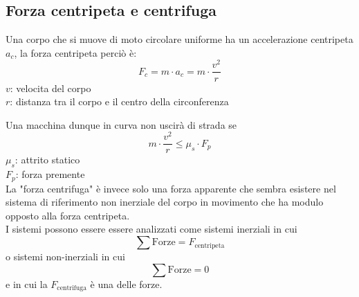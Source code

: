 \subsection{Forza centripeta e centrifuga}
Una corpo che si muove di moto circolare uniforme ha un accelerazione centripeta $a_c$, la forza 
centripeta perciò è:   
\begin{equation*}
  F_c =m\cdot a_c= m\cdot\frac{v^{2}}{r}
\end{equation*}
$v$: velocita del corpo\\
$r$: distanza tra il corpo e il centro della circonferenza
\begin{center}	
\end{center}
Una macchina dunque in curva non uscirà di strada se 
\begin{equation*}
  m\cdot\frac{v^{2}}{r} \leq \mu_s\cdot F_p
\end{equation*}
$\mu_s$: attrito statico\\
$F_p$: forza premente\\ [\baselineskip]

La "forza centrifuga" è invece solo una forza apparente che sembra esistere nel sistema di 
riferimento non inerziale del corpo in movimento che ha modulo opposto alla forza centripeta.\\
I sistemi possono essere essere analizzati come sistemi inerziali in cui 
\begin{equation*}
  \sum \text{Forze}=F_{\text{centripeta}}
\end{equation*}
o sistemi non-inerziali in cui 
\begin{equation*}
  \sum \text{Forze}=0
\end{equation*}
e in cui la $F_{\text{centrifuga}}$ è una delle forze.

